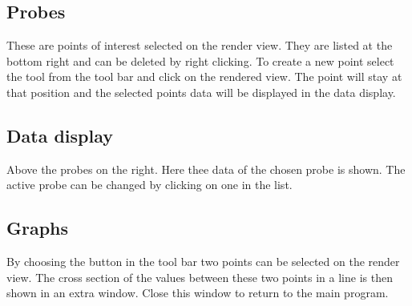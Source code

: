 \documentclass[paper=a4]{proc}
\begin{document}
		\subsection{Probes}
		These are points of interest selected on the render view. They are listed at the bottom right and can be deleted by right clicking. To create a new point select the tool from the tool bar and click on the rendered view. The point will stay at that position and the selected points data will be displayed in the data display.
		\subsection{Data display}
		Above the probes on the right. Here thee data of the chosen probe is shown. The active probe can be changed by clicking on one in the list.
		\subsection{Graphs}
		By choosing the button in the tool bar two points can be selected on the render view. The cross section of the values between these two points in a line is then shown in an extra window. Close this window to return to the main program.
\end{document}
